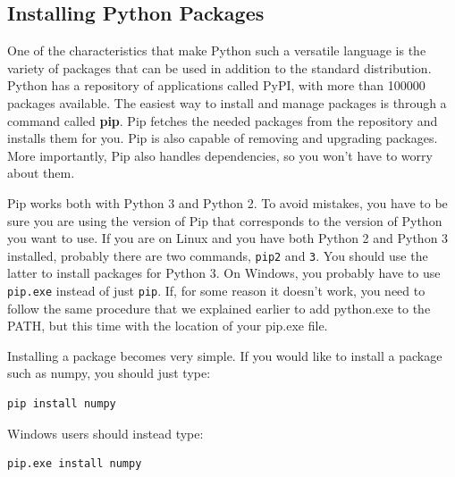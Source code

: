 \subsection{Installing Python Packages}\label{subsec:installing-python-packages2}\label{subsec:installing-python-packages}
One of the characteristics that make Python such a versatile language is the variety of packages that can be used in addition to the standard distribution. Python has a repository of applications called PyPI, with more than 100000 packages available. The easiest way to install and manage packages is through a command called \textbf{pip}. Pip fetches the needed packages from the repository and installs them for you. Pip is also capable of removing and upgrading packages. More importantly, Pip also handles dependencies, so you won't have to worry about them.

Pip works both with Python 3 and Python 2. To avoid mistakes, you have to be sure you are using the version of Pip that corresponds to the version of Python you want to use. If you are on Linux and you have both Python 2 and Python 3 installed, probably there are two commands, \texttt{pip2} and \texttt{3}. You should use the latter to install packages for Python 3. On Windows, you probably have to use \texttt{pip.exe} instead of just \texttt{pip}. If, for some reason it doesn't work, you need to follow the same procedure that we explained earlier to add python.exe to the PATH, but this time with the location of your pip.exe file.


Installing a package becomes very simple. If you would like to install a package such as numpy, you should just type:
\begin{verbatim}
pip install numpy
\end{verbatim}

Windows users should instead type:
\begin{verbatim}
pip.exe install numpy
\end{verbatim}


